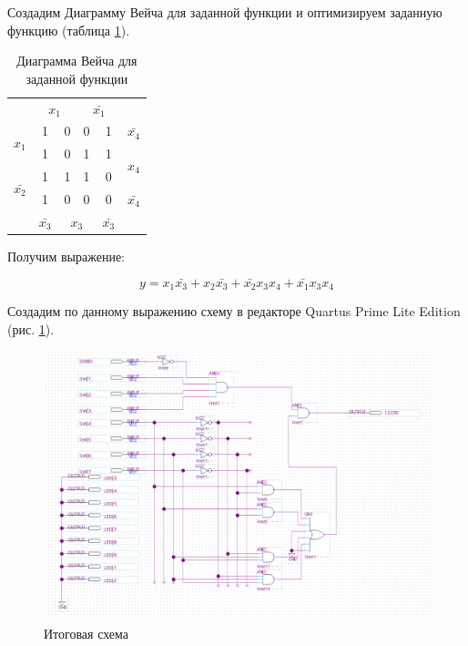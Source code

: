 \documentclass[a4paper,14pt]{article}
\begin{document}
Создадим Диаграмму Вейча для заданной функции и оптимизируем заданную функцию (таблица \ref{tab:carno}).

\begin{table}[H]
	\centering
	\caption{Диаграмма Вейча для заданной функции}
	\label{tab:carno}
	\begin{tabular}{cccccc}
		& \multicolumn{2}{c}{$x_1$}                       & \multicolumn{2}{c}{$\bar{x_1}$}                 &                        \\ \cline{2-5}
		\multicolumn{1}{c|}{\multirow{2}{*}{$x_1$}}       & \multicolumn{1}{c|}{1} & \multicolumn{1}{c|}{0} & \multicolumn{1}{c|}{0} & \multicolumn{1}{c|}{1} & $\bar{x_4}$            \\ \cline{2-5}
		\multicolumn{1}{c|}{}                             & \multicolumn{1}{c|}{1} & \multicolumn{1}{c|}{0} & \multicolumn{1}{c|}{1} & \multicolumn{1}{c|}{1} & \multirow{2}{*}{$x_4$} \\ \cline{2-5}
		\multicolumn{1}{c|}{\multirow{2}{*}{$\bar{x_2}$}} & \multicolumn{1}{c|}{1} & \multicolumn{1}{c|}{1} & \multicolumn{1}{c|}{1} & \multicolumn{1}{c|}{0} &                        \\ \cline{2-5}
		\multicolumn{1}{c|}{}                             & \multicolumn{1}{c|}{1} & \multicolumn{1}{c|}{0} & \multicolumn{1}{c|}{0} & \multicolumn{1}{c|}{0} & $\bar{x_4}$            \\ \cline{2-5}
		& $\bar{x_3}$            & \multicolumn{2}{c}{$x_3$}                       & $\bar{x_3}$            &                       
	\end{tabular}
\end{table}

Получим выражение:

\begin{equation}
	y = x_1 \bar{x_3} + x_2 \bar{x_3} + \bar{x_2} x_3 x_4 + \bar{x_1} x_3 x_4
\end{equation}

Создадим по данному выражению схему в редакторе Quartus Prime Lite Edition (рис. \ref{fig:schema}).

\begin{figure}[H]
	\centering
	\includegraphics[width=\linewidth]{image/schema}
	\caption{Итоговая схема}
	\label{fig:schema}
\end{figure}
\end{document}
